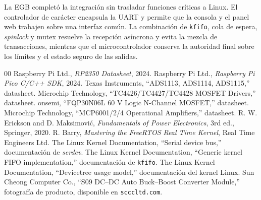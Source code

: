 \documentclass[conference]{IEEEtran}
\begin{document}
La EGB completó la integración sin trasladar funciones críticas a Linux. El controlador de carácter encapsula la UART y permite que la consola y el panel web trabajen sobre una interfaz común. La combinación de \texttt{kfifo}, cola de espera, \textit{spinlock} y mutex resuelve la recepción asíncrona y evita la mezcla de transacciones, mientras que el microcontrolador conserva la autoridad final sobre los límites y el estado seguro de las salidas.

\begin{thebibliography}{00}
 Raspberry Pi Ltd., \textit{RP2350 Datasheet}, 2024.
 Raspberry Pi Ltd., \textit{Raspberry Pi Pico C/C++ SDK}, 2024.
 Texas Instruments, ``ADS1113, ADS1114, ADS1115,'' datasheet.
 Microchip Technology, ``TC4426/TC4427/TC4428 MOSFET Drivers,'' datasheet.
 onsemi, ``FQP30N06L 60 V Logic N-Channel MOSFET,'' datasheet.
 Microchip Technology, ``MCP6001/2/4 Operational Amplifiers,'' datasheet.
 R. W. Erickson and D. Maksimovi\'c, \textit{Fundamentals of Power Electronics}, 3rd ed., Springer, 2020.
 R. Barry, \textit{Mastering the FreeRTOS Real Time Kernel}, Real Time Engineers Ltd.
 The Linux Kernel Documentation, ``Serial device bus,'' documentación de \textit{serdev}.
 The Linux Kernel Documentation, ``Generic kernel FIFO implementation,'' documentación de \texttt{kfifo}.
 The Linux Kernel Documentation, ``Devicetree usage model,'' documentación del kernel Linux.
 Sun Cheong Computer Co., ``S09 DC--DC Auto Buck--Boost Converter Module,'' fotografía de producto, disponible en \texttt{scccltd.com}.
\end{thebibliography}

\onecolumn
\appendices
\clearpage
\end{document}
